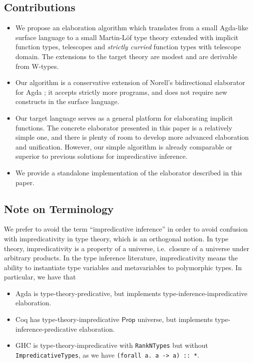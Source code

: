 \documentclass[acmsmall,review,anonymous]{acmart}\settopmatter{printfolios=true,printccs=false,printacmref=false}
\begin{document}
\subsection{Contributions}
\begin{itemize}
  \item We propose an elaboration algorithm which translates from a small
    Agda-like surface language to a small Martin-L\"of type theory extended with
    implicit function types, telescopes and \emph{strictly curried} function
    types with telescope domain. The extensions to the target theory are modest
    and are derivable from W-types.
  \item Our algorithm is a conservative extension of Norell's bidirectional
    elaborator for Agda \cite[Chapter~3.6]{norell07thesis}; it accepts strictly more
    programs, and does not require new constructs in the surface language.
  \item Our target language serves as a general platform for elaborating
    implicit functions. The concrete elaborator presented in this paper is a
    relatively simple one, and there is plenty of room to develop more advanced
    elaboration and unification. However, our simple algorithm is already
    comparable or superior to previous solutions for impredicative inference.
  \item We provide a standalone implementation of the elaborator described in
    this paper.
\end{itemize}

\subsection{Note on Terminology}

We prefer to avoid the term ``impredicative inference'' in order to avoid
confusion with impredicativity in type theory, which is an orthogonal notion. In
type theory, impredicativity is a property of a universe, i.e.\ closure of a
universe under arbitrary products. In the type inference literature,
impredicativity means the ability to instantiate type variables and
metavariables to polymorphic types. In particular, we have that
\begin{itemize}
  \item Agda is type-theory-predicative, but implements type-inference-impredicative elaboration.
  \item Coq has type-theory-impredicative $\mathsf{Prop}$ universe, but
    implements type-inference-predicative elaboration.
  \item GHC is type-theory-impredicative with \texttt{RankNTypes} but without
    \texttt{ImpredicativeTypes}, as we have \texttt{(forall a. a -> a) :: *}.
\end{itemize}
\end{document}
